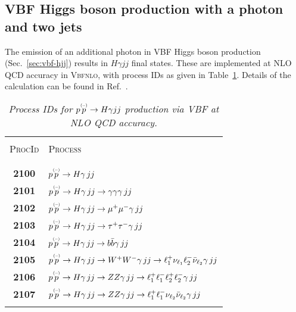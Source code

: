 \documentclass[english,12pt]{article}
\begin{document}
\subsection{VBF Higgs boson production with a photon and two jets}

The emission of an additional photon in VBF Higgs boson production 
(Sec.~\ref{sec:vbf-hjj}) results in $H \gamma jj$ final states. These
are implemented at NLO QCD accuracy in \textsc{Vbfnlo}, with process IDs as given in 
Table~\ref{tab:prcHAjj}. Details of the calculation can be found in
Ref.~\cite{Arnold:2010dx}.
\begin{table}[t!]
\newcommand{\lstrut}{{$\strut\atop\strut$}}
\begin{center}
\small
\begin{tabular}{c|l}
\hline
&\\
\textsc{ProcId} & \textsc{Process}  \\
&\\
\hline
&\\
\bf 2100 & $p \overset{\mbox{\tiny{(--)}}}{p} \to H \gamma \, jj$  \\
\bf 2101 & $p \overset{\mbox{\tiny{(--)}}}{p} \to H \gamma \, jj\to \gamma\gamma \gamma \, jj$ \\
\bf 2102 & $p \overset{\mbox{\tiny{(--)}}}{p} \to H \gamma \, jj\to \mu^+\mu^- \gamma \, jj$ \\
\bf 2103 & $p \overset{\mbox{\tiny{(--)}}}{p} \to H \gamma \, jj\to \tau^+\tau^- \gamma \, jj$ \\
\bf 2104 & $p \overset{\mbox{\tiny{(--)}}}{p} \to H \gamma \, jj\to b\bar{b} \gamma \, jj$ \\
\bf 2105 & $p \overset{\mbox{\tiny{(--)}}}{p} \to H \gamma \, jj\to W^+W^- \gamma \, jj\to \ell_{1}^+\nu_{\ell_{1}} \ell_{2}^- 
\bar{\nu}_{\ell_{2}} \gamma \,jj$ \\
\bf 2106 & $p \overset{\mbox{\tiny{(--)}}}{p} \to H \gamma \, jj\to ZZ \gamma \, jj\to \ell_{1}^+ \ell_{1}^- \ell_{2}^+ 
\ell_{2}^- \gamma \,jj$ \\
\bf 2107 & $p \overset{\mbox{\tiny{(--)}}}{p} \to H \gamma \, jj\to ZZ \gamma \, jj\to \ell_{1}^+ \ell_{1}^- \nu_{\ell_{2}}  
\bar{\nu}_{\ell_{2}} \gamma \,jj$ \\
&\\
\hline
\end{tabular}
\caption {\em  Process IDs for $p \overset{\mbox{\tiny{(--)}}}{p} \to H \gamma jj$ production via
  VBF at NLO QCD accuracy. }
\vspace{0.2cm}
\label{tab:prcHAjj}
\end{center}
\end{table}
\end{document}
